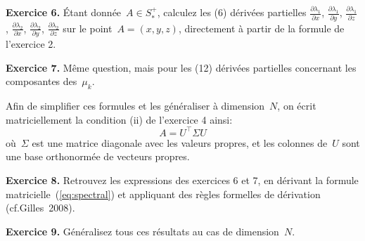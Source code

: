 \documentclass[a4paper,11pt]{article}
\begin{document}
{\bf Exercice 6.}
Étant donnée~$A\in S^+_*$, calculez les (6) dérivées partielles
$\frac{\partial\lambda_1}{\partial x}$,
$\frac{\partial\lambda_1}{\partial y}$,
$\frac{\partial\lambda_1}{\partial z}$,
$\frac{\partial\lambda_2}{\partial x}$,
$\frac{\partial\lambda_2}{\partial y}$,
$\frac{\partial\lambda_2}{\partial z}$
sur le point~$A=(x,y,z)$, directement à partir de la formule de l'exercice 2.

{\bf Exercice 7.}
Même question, mais pour les (12) dérivées partielles concernant les
composantes des~$\mu_k$.

Afin de simplifier ces formules et les généraliser à dimension~$N$,
on écrit matriciellement la condition (ii) de l'exercice 4 ainsi:
\begin{equation}\label{eq:spectral}
	A = U^\top \Sigma U
\end{equation}
où~$\Sigma$ est une matrice diagonale avec les valeurs propres, et les colonnes
de~$U$ sont une base orthonormée de vecteurs propres.

{\bf Exercice 8.}
Retrouvez les expressions des exercices 6 et 7, en dérivant la formule
matricielle~(\ref{eq:spectral}) et appliquant des règles formelles de
dérivation (cf.Gilles~2008).

{\bf Exercice 9.}
Généralisez tous ces résultats au cas de dimension~$N$.
\end{document}
